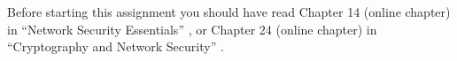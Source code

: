 Before starting this assignment you should have read Chapter 14 (online 
chapter) in ``Network Security Essentials'' \cite{Stallings2013nse}, or Chapter 
24 (online chapter) in ``Cryptography and Network Security'' 
\cite{Stallings2013can}.
